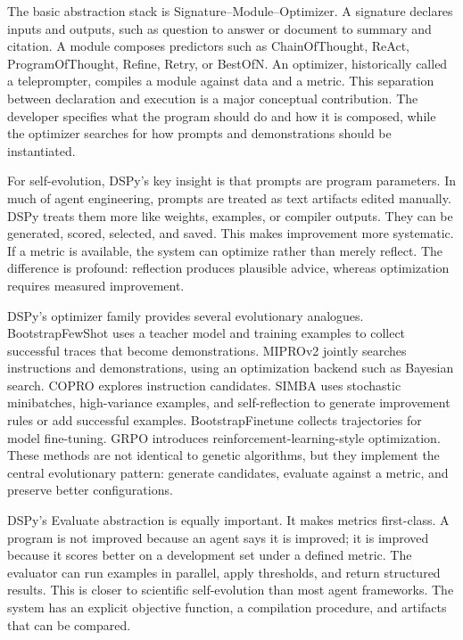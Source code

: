 The basic abstraction stack is Signature--Module--Optimizer.  A signature declares inputs and outputs, such as question to answer or document to summary and citation.  A module composes predictors such as ChainOfThought, ReAct, ProgramOfThought, Refine, Retry, or BestOfN.  An optimizer, historically called a teleprompter, compiles a module against data and a metric.  This separation between declaration and execution is a major conceptual contribution.  The developer specifies what the program should do and how it is composed, while the optimizer searches for how prompts and demonstrations should be instantiated.

For self-evolution, DSPy's key insight is that prompts are program parameters.  In much of agent engineering, prompts are treated as text artifacts edited manually.  DSPy treats them more like weights, examples, or compiler outputs.  They can be generated, scored, selected, and saved.  This makes improvement more systematic.  If a metric is available, the system can optimize rather than merely reflect.  The difference is profound: reflection produces plausible advice, whereas optimization requires measured improvement.

DSPy's optimizer family provides several evolutionary analogues.  BootstrapFewShot uses a teacher model and training examples to collect successful traces that become demonstrations.  MIPROv2 jointly searches instructions and demonstrations, using an optimization backend such as Bayesian search.  COPRO explores instruction candidates.  SIMBA uses stochastic minibatches, high-variance examples, and self-reflection to generate improvement rules or add successful examples.  BootstrapFinetune collects trajectories for model fine-tuning.  GRPO introduces reinforcement-learning-style optimization.  These methods are not identical to genetic algorithms, but they implement the central evolutionary pattern: generate candidates, evaluate against a metric, and preserve better configurations.

DSPy's Evaluate abstraction is equally important.  It makes metrics first-class.  A program is not improved because an agent says it is improved; it is improved because it scores better on a development set under a defined metric.  The evaluator can run examples in parallel, apply thresholds, and return structured results.  This is closer to scientific self-evolution than most agent frameworks.  The system has an explicit objective function, a compilation procedure, and artifacts that can be compared.

